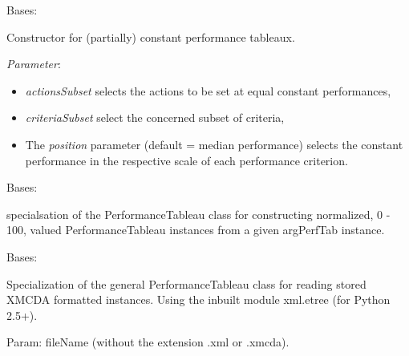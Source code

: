 \documentclass[letterpaper,10pt,english]{sphinxmanual}
\begin{document}
\begin{fulllineitems}
\label{techDoc:perfTabs.ConstantPerformanceTableau}
Bases: {\hyperref[techDoc:perfTabs.PerformanceTableau]{\emph{}}}

Constructor for (partially) constant performance tableaux.

\emph{Parameter}:
\begin{itemize}
\item {} 
\emph{actionsSubset} selects the actions to be set at equal constant performances,

\item {} 
\emph{criteriaSubset} select the concerned subset of criteria,

\item {} 
The \emph{position} parameter (default = median performance) selects the constant performance in the respective scale of each performance criterion.

\end{itemize}

\end{fulllineitems}


\begin{fulllineitems}
\label{techDoc:perfTabs.NormalizedPerformanceTableau}
Bases: {\hyperref[techDoc:perfTabs.PerformanceTableau]{\emph{}}}

specialsation of the PerformanceTableau class for
constructing normalized, 0 - 100, valued PerformanceTableau
instances from a given argPerfTab instance.

\end{fulllineitems}


\begin{fulllineitems}
\label{techDoc:perfTabs.OldXMCDAPerformanceTableau}
Bases: {\hyperref[techDoc:perfTabs.PerformanceTableau]{\emph{}}}

Specialization of the general PerformanceTableau class for reading
stored XMCDA formatted instances. Using the inbuilt module
xml.etree (for Python 2.5+).

Param: fileName (without the extension .xml or .xmcda).

\end{fulllineitems}
\end{document}
